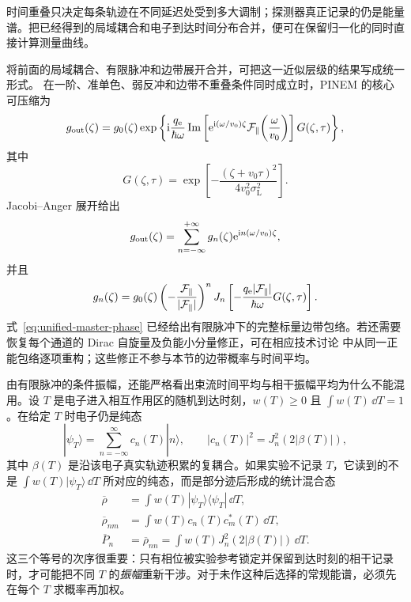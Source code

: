 时间重叠只决定每条轨迹在不同延迟处受到多大调制；探测器真正记录的仍是能量谱。把已经得到的局域耦合和电子到达时间分布合并，便可在保留归一化的同时直接计算测量曲线。


将前面的局域耦合、有限脉冲和边带展开合并，可把这一近似层级的结果写成统一形式。
在一阶、准单色、弱反冲和边带不重叠条件同时成立时，PINEM 的核心可压缩为
\begin{equation}
{
g_{\rm out}(\zeta)
=
g_0(\zeta)
\exp\left\{
\mathrm{i}\frac{q_{\rm e}}{\hbar\omega}
\operatorname{Im}\left[
\mathrm{e}^{\mathrm{i}(\omega/v_0)\zeta}
\mathcal F_{\parallel}\!\left(\frac{\omega}{v_0}\right)
\right]
G(\zeta,\tau)
\right\},}
\label{eq:unified-master-phase}
\end{equation}
其中
\[
G(\zeta,\tau)
=
\exp\left[
-\frac{(\zeta+v_0\tau)^2}
{4v_0^2\sigma_{\mathrm L}^2}
\right].
\]
Jacobi--Anger 展开给出
\begin{equation}
{
g_{\rm out}(\zeta)
=
\sum_{n=-\infty}^{+\infty}
g_n(\zeta)
\mathrm{e}^{\mathrm{i}n(\omega/v_0)\zeta},}
\end{equation}
并且
\begin{equation}
{
g_n(\zeta)
=
g_0(\zeta)
\left(-\frac{\mathcal F_{\parallel}}{|\mathcal F_{\parallel}|}\right)^n
J_n\left[
-\frac{q_{\rm e}|\mathcal F_{\parallel}|}{\hbar\omega}
G(\zeta,\tau)
\right].}
\label{eq:unified-gn}
\end{equation}
式~\cref{eq:unified-master-phase} 已经给出有限脉冲下的完整标量边带包络。若还需要恢复每个通道的 Dirac 自旋量及负能小分量修正，可在相应技术讨论 中从同一正能包络逐项重构；这些修正不参与本节的边带概率与时间平均。


由有限脉冲的条件振幅，还能严格看出束流时间平均与相干振幅平均为什么不能混用。设 $T$ 是电子进入相互作用区的随机到达时刻，$w(T)\ge0$ 且 $\int w(T)\,\dd T=1$。在给定 $T$ 时电子仍是纯态
\begin{equation}
 |\psi_T\rangle=\sum_{n=-\infty}^{\infty}c_n(T)|n\rangle,
 \qquad |c_n(T)|^2=J_n^2(2|\beta(T)|),
 \label{eq:pulse-conditional-pure-state}
\end{equation}
其中 $\beta(T)$ 是沿该电子真实轨迹积累的复耦合。如果实验不记录 $T$，它读到的不是 $\int w(T)|\psi_T\rangle\,\dd T$ 所对应的纯态，而是部分迹后形成的统计混合态
\begin{align}
 \overline\rho
 &=\int w(T)|\psi_T\rangle\langle\psi_T|\,\dd T,\\
 \overline\rho_{nm}
 &=\int w(T)c_n(T)c_m^*(T)\,\dd T,\\
 \overline P_n
 &=\overline\rho_{nn}
 =\int w(T)J_n^2(2|\beta(T)|)\,\dd T.
 \label{eq:pulse-density-operator-average}
\end{align}
这三个等号的次序很重要：只有相位被实验参考锁定并保留到达时刻的相干记录时，才可能把不同 $T$ 的\emph{振幅}重新干涉。对于未作这种后选择的常规能谱，必须先在每个 $T$ 求概率再加权。

